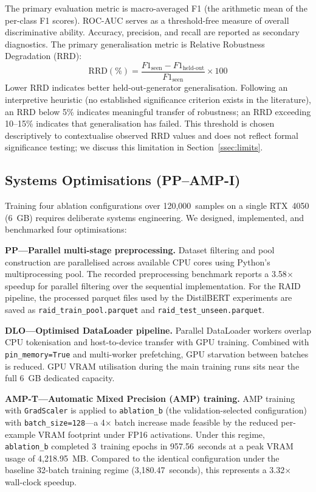 \documentclass[conference]{IEEEtran}
\begin{document}
The primary evaluation metric is macro-averaged F1 (the arithmetic mean of the
per-class F1 scores). ROC-AUC serves as a threshold-free measure of overall
discriminative ability.
Accuracy, precision, and recall are reported as secondary diagnostics.
The primary generalisation metric is Relative Robustness
Degradation (RRD):
\begin{equation}
\text{RRD}(\%) = \frac{F1_{\text{seen}} - F1_{\text{held-out}}}{F1_{\text{seen}}} \times 100
\label{eq:rrd}
\end{equation}
Lower RRD indicates better held-out-generator generalisation. Following an interpretive heuristic (no established significance
criterion exists in the literature), an RRD below 5\%
indicates meaningful transfer of robustness; an RRD exceeding 10--15\% indicates
that generalisation has failed. This threshold is chosen descriptively to
contextualise observed RRD values and does not reflect formal significance
testing; we discuss this limitation in Section~\ref{ssec:limits}.

\subsection{Systems Optimisations (PP--AMP-I)}

Training four ablation configurations over 120,000~samples on a single RTX~4050 (6~GB)
requires deliberate systems engineering. We designed, implemented, and benchmarked
four optimisations:

\textbf{PP---Parallel multi-stage preprocessing.} Dataset filtering and pool
construction are parallelised across available CPU cores using Python's
multiprocessing pool. The recorded preprocessing benchmark reports a
3.58$\times$ speedup for parallel filtering over the sequential implementation.
For the RAID pipeline, the processed parquet files used by the DistilBERT
experiments are saved as \texttt{raid\_train\_pool.parquet} and
\texttt{raid\_test\_unseen.parquet}.

\textbf{DLO---Optimised DataLoader pipeline.} Parallel DataLoader workers overlap
CPU tokenisation and host-to-device transfer with GPU training. Combined with
\texttt{pin\_memory=True} and multi-worker prefetching, GPU starvation between
batches is reduced. GPU VRAM utilisation during the main training runs sits near
the full 6~GB dedicated capacity.

\textbf{AMP-T---Automatic Mixed Precision (AMP) training.} AMP training with
\texttt{GradScaler} is applied to \texttt{ablation\_b} (the validation-selected configuration)
with \texttt{batch\_size=128}---a 4$\times$ batch increase made feasible by the
reduced per-example VRAM footprint under FP16 activations. Under this regime,
\texttt{ablation\_b} completed 3~training epochs in 957.56~seconds at a peak VRAM
usage of 4,218.95~MB. Compared to the identical configuration under the baseline
32-batch training regime (3,180.47~seconds), this represents a 3.32$\times$
wall-clock speedup.
\end{document}
